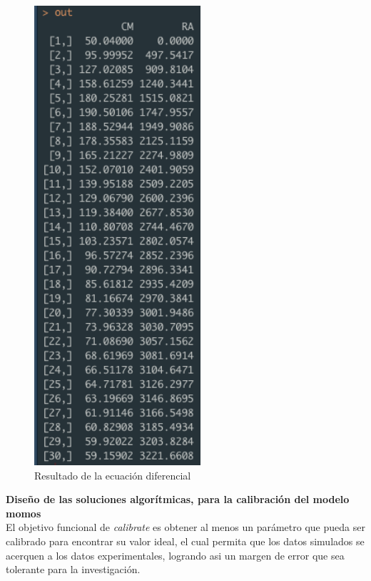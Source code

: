 \begin{figure}[H]
  \centering
    \begin{minipage}{0.55\textwidth}
      \centering
      \includegraphics[width=0.55\textwidth]{figure_4_13.png}
      \caption{Resultado de la ecuaci\'on diferencial}
      \label{fig:Fig}
    \end{minipage}%
    \hspace{5mm}
\end{figure}

\noindent
\textbf{Diseño de las soluciones algor\'itmicas, para la calibraci\'on del modelo momos}\\

El objetivo funcional de \textit{calibrate} es obtener al menos un par\'ametro que pueda ser calibrado para encontrar su valor ideal, el cual permita que los datos simulados se acerquen a los datos experimentales, logrando asi un margen de error que sea tolerante para la investigaci\'on.\\

